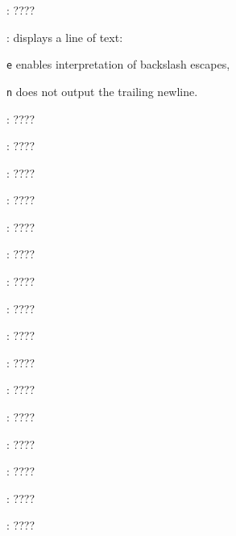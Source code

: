 \begin{compactenum}
\item [\symbolbash] : \dotfill ????

\item [\symbolbash] : displays a line of text:
\item [\texttt{e}] enables interpretation of backslash escapes,
\item [\texttt{n}] does not output the trailing newline.

\item [\symbolbash] : \dotfill ????

\item [\symbolbash] : \dotfill ????

\item [\symbolbash] : \dotfill ????

\item [\symbolbash] : \dotfill ????

\item [\symbolbash] : \dotfill ????

\item [\symbolbash] : \dotfill ????

\item [\symbolbash] : \dotfill ????

\item [\symbolbash] : \dotfill ????

\item [\symbolbash] : \dotfill ????

\item [\symbolbash] : \dotfill ????

\item [\symbolbash] : \dotfill ????

\item [\symbolbash] : \dotfill ????

\item [\symbolbash] : \dotfill ????

\item [\symbolbash] : \dotfill ????

\item [\symbolbash] : \dotfill ????

\item [\symbolbash] : \dotfill ????


\end{compactenum}
